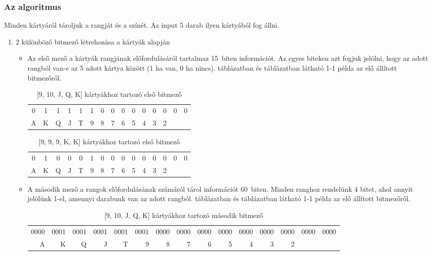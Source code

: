 \documentclass[]{thesis-ekf}
\theoremstyle{definition}
\theoremstyle{remark}
\begin{document}
\subsubsection{Az algoritmus}

Minden kártyáról tároljuk a rangját és a színét. Az input 5 darab ilyen kártyából fog állni.

\begin{enumerate}
	\item 2 különböző bitmező létrehozása a kártyák alapján
	\begin{itemize}
		\item Az első mező a kártyák rangjának előfordulásáról tartalmaz 15~biten információt. Az egyes biteken azt fogjuk jelölni, hogy az adott rangból van-e az 5 adott kártya között (1 ha van, 0 ha nincs).  táblázatban és  táblázatban látható 1-1 példa az elő állított bitmezőről.
		
		\begin{table}[ht!]
			\centering
			\footnotesize
			\begin{tabular}{*{15}{c}}
				0 & 1 & 1 & 1 & 1 & 1 & 0 & 0 & 0 & 0 & 0 & 0 & 0 & 0 & 0\\
				A & K & Q & J & T & 9 & 8 & 7 & 6 & 5 & 4 & 3 & 2
			\end{tabular}
			\caption{[9, 10, J, Q, K] kártyákhoz tartozó első bitmező}
			\label{tab-bitfieldvalues1}
		\end{table}
		
		\begin{table}[ht!]
			\centering
			\footnotesize
			\begin{tabular}{*{15}{c}}
				0 & 1 & 0 & 0 & 0 & 1 & 0 & 0 & 0 & 0 & 0 & 0 & 0 & 0 & 0\\
				A & K & Q & J & T & 9 & 8 & 7 & 6 & 5 & 4 & 3 & 2
			\end{tabular}
			\caption{[9, 9, 9, K, K] kártyákhoz tartozó első bitmező}
			\label{tab-bitfieldvalues2}
		\end{table}
		
		\item A második mező a rangok előfordulásának számáról tárol információt 60~biten. Minden ranghoz rendelünk 4 bitet, ahol annyit jelölünk 1-el, amennyi darabunk van az adott rangból.  táblázatban és  táblázatban látható 1-1 példa az elő állított bitmezőről.
		
		\begin{table}[ht!]
			\centering
			\footnotesize
			\begin{tabular}{*{15}{r}}
				0000 & 0001 & 0001 & 0001 & 0001 & 0001 & 0000 & 0000 & 0000 & 0000 & 0000 & 0000 & 0000 & 0000 & 0000\\
				A & K & Q & J & T & 9 & 8 & 7 & 6 & 5 & 4 & 3 & 2
			\end{tabular}
			\caption{[9, 10, J, Q, K] kártyákhoz tartozó második bitmező}
			\label{tab-bitfieldcounts1}
		\end{table}
		

\end{itemize}
\end{enumerate}
\end{document}
